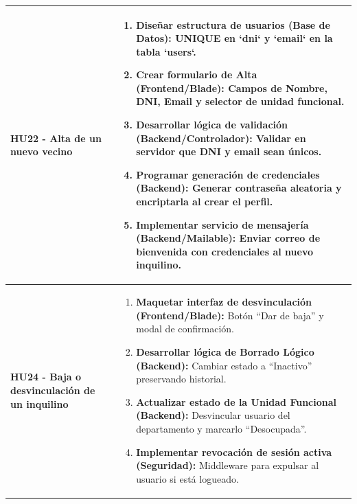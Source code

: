 \begin{longtable}{|p{4.5cm}|p{10.5cm}|}
    \\ \hline

        \textbf{HU22 - Alta de un nuevo vecino} 
        
        & 

            \begin{enumerate}[leftmargin=*,nosep]
                \item \textbf{Diseñar estructura de usuarios (Base de Datos):} UNIQUE en `dni` y `email` en la tabla `users`.
                \item \textbf{Crear formulario de Alta (Frontend/Blade):} Campos de Nombre, DNI, Email y selector de unidad funcional.
                \item \textbf{Desarrollar lógica de validación (Backend/Controlador):} Validar en servidor que DNI y email sean únicos.
                \item \textbf{Programar generación de credenciales (Backend):} Generar contraseña aleatoria y encriptarla al crear el perfil.
                \item \textbf{Implementar servicio de mensajería (Backend/Mailable):} Enviar correo de bienvenida con credenciales al nuevo inquilino.
            \end{enumerate} 
        
    \\ \hline

        \textbf{HU24 - Baja o desvinculación de un inquilino} 
        
        & 

            \begin{enumerate}[leftmargin=*,nosep]
                \item \textbf{Maquetar interfaz de desvinculación (Frontend/Blade):} Botón ``Dar de baja'' y modal de confirmación.
                \item \textbf{Desarrollar lógica de Borrado Lógico (Backend):} Cambiar estado a ``Inactivo'' preservando historial.
                \item \textbf{Actualizar estado de la Unidad Funcional (Backend):} Desvincular usuario del departamento y marcarlo ``Desocupada''.
                \item \textbf{Implementar revocación de sesión activa (Seguridad):} Middleware para expulsar al usuario si está logueado.
            \end{enumerate} 
        
    \\ \hline


\end{longtable}
